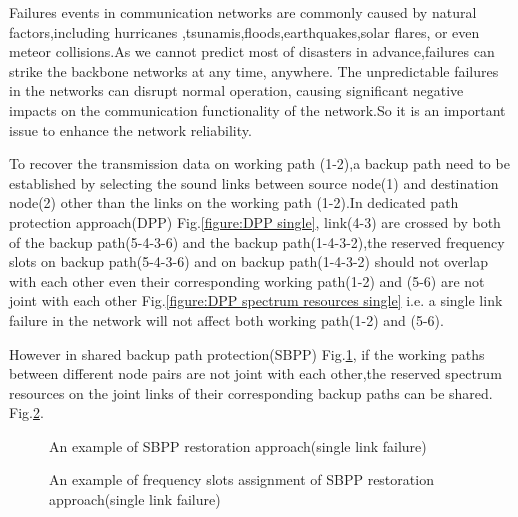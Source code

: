 \documentclass[a4paper,11pt]{report}
\begin{document}
Failures events in communication networks are commonly caused by natural factors,including hurricanes ,tsunamis,floods,earthquakes,solar flares, or even meteor collisions.As we cannot predict most of disasters in advance,failures can strike the backbone networks at any time, anywhere\cite{Roza2015}. The unpredictable failures in the networks can disrupt normal operation, causing significant negative impacts on the communication functionality of the network.So it is an important issue to enhance the network reliability.\par

To recover the transmission data on working path (1-2),a backup path need to be established by selecting the sound links between source node(1) and destination node(2) other than the links on the working path (1-2).In dedicated path protection approach(DPP)\cite{shen2014} Fig.\ref{figure:DPP single}, link(4-3) are crossed by both of the backup path(5-4-3-6) and the backup path(1-4-3-2),the reserved frequency slots on backup path(5-4-3-6) and on backup path(1-4-3-2) should not overlap with each other even their corresponding working path(1-2) and (5-6) are not joint with each other Fig.\ref{figure:DPP spectrum resources single} i.e. a single link failure in the network will not affect both working path(1-2) and (5-6).\par

However in shared backup path protection(SBPP)\cite{shen2014}  Fig.\ref{figure:SBPP single}, if the working paths between different node pairs are not joint with each other,the reserved spectrum resources on the joint links of their corresponding backup paths can be shared. Fig.\ref{figure:SBPP spectrum resources single}.
        \begin{figure}[!h]
        \begin{center}
        \end{center}
        \caption{An example of SBPP restoration approach(single link failure)}
        \label{figure:SBPP single}
        \end{figure}

        \begin{figure}[!h]
        \begin{center}
        \end{center}
        \caption{An example of frequency slots assignment of SBPP restoration approach(single link failure)}
        \label{figure:SBPP spectrum resources single}
        \end{figure}
\end{document}
